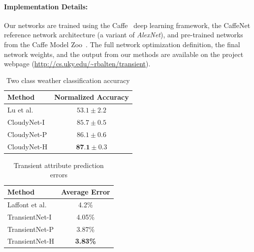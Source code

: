 \documentclass[10pt,twocolumn,letterpaper]{article}
\newcommand{\todo}[1]{\textcolor{red}{todo: {\em #1}}}
\begin{document}
%

\vspace{-1em}
\paragraph{Implementation Details:} Our networks are trained using the
Caffe~\cite{caffe14} deep learning framework, the CaffeNet reference network
architecture (a variant of \emph{AlexNet}), and pre-trained networks from the
Caffe Model Zoo~\cite{modelzoosite}.  The full network optimization definition,
the final network weights, and the output from our methods are available on the
project webpage (\url{http://cs.uky.edu/~rbalten/transient}).


\begin{table}[t]
	\centering
	\caption{Two class weather classification accuracy}
	\begin{tabular}{ | l | c | }
		\hline
			Method & Normalized Accuracy \\ \hline \hline
			Lu et al.~\cite{lutwoclass}& $ 53.1 \pm 2.2 $ \\ \hline
			CloudyNet-I & $ 85.7 \pm 0.5 $ \\ \hline
			CloudyNet-P & $ 86.1 \pm 0.6 $ \\ \hline
			CloudyNet-H & $ \textbf{87.1} \pm 0.3 $ \\ 
		\hline
	\end{tabular}
	\label{tbl:twoclass}
\end{table}

\begin{table}[t]
	\centering
	\caption{Transient attribute prediction errors}
	\begin{tabular}{ | l | c | }
		\hline
			Method & Average Error \\ \hline \hline
			Laffont et al.~\cite{Laffont14}& 4.2\% \\ \hline
			TransientNet-I & 4.05\% \\ \hline
			TransientNet-P & 3.87\% \\ \hline
			TransientNet-H & \textbf{3.83\%} \\ 
		\hline
	\end{tabular}
	\label{tbl:transient}
\end{table}
\end{document}
